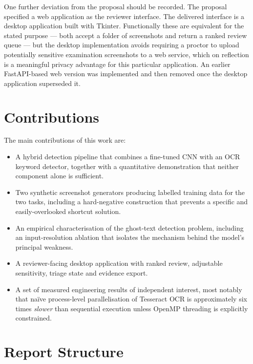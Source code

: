 \documentclass[12pt,oneside]{report}
\begin{document}
One further deviation from the proposal should be recorded. The proposal
specified a web application as the reviewer interface. The delivered interface
is a desktop application built with Tkinter. Functionally these are equivalent
for the stated purpose --- both accept a folder of screenshots and return a
ranked review queue --- but the desktop implementation avoids requiring a
proctor to upload potentially sensitive examination screenshots to a web
service, which on reflection is a meaningful privacy advantage for this
particular application. An earlier FastAPI-based web version was implemented
and then removed once the desktop application superseded it.

\section{Contributions}
\label{sec:contributions}

The main contributions of this work are:

\begin{itemize}[itemsep=2pt]
  \item A hybrid detection pipeline that combines a fine-tuned CNN with an OCR
        keyword detector, together with a quantitative demonstration that
        neither component alone is sufficient.
  \item Two synthetic screenshot generators producing labelled training data
        for the two tasks, including a hard-negative construction that prevents
        a specific and easily-overlooked shortcut solution.
  \item An empirical characterisation of the ghost-text detection problem,
        including an input-resolution ablation that isolates the mechanism
        behind the model's principal weakness.
  \item A reviewer-facing desktop application with ranked review, adjustable
        sensitivity, triage state and evidence export.
  \item A set of measured engineering results of independent interest, most
        notably that na\"ive process-level parallelisation of Tesseract OCR is
        approximately six times \emph{slower} than sequential execution unless
        OpenMP threading is explicitly constrained.
\end{itemize}

\section{Report Structure}
\label{sec:structure}
\end{document}
